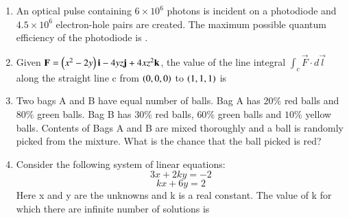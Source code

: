 \documentclass[journal,12pt,onecolumn]{IEEEtran}
\theoremstyle{remark}
\begin{document}
\begin{enumerate}
    \hfill{}

    \item An optical pulse containing $6\times10^{6}$ photons is incident on a photodiode and $4.5\times10^{6}$ electron-hole pairs are created. The maximum possible quantum efficiency  of the photodiode is \underline{\hspace{2cm}}.
    
    \hfill{}
    
    \item Given $\mathbf{F}=\left(x^{2}-2y\right)\mathbf{i}-4yz\mathbf{j}+4xz^{2}\mathbf{k}$, the value of the line integral $\int_{c}\vec{F}\cdot d\vec{l}$ along the straight line c from $\left(0,0,0\right)$ to $\left(1,1,1\right)$ is
    
    \hfill{}
    \begin{enumerate}
    \end{enumerate}

    \item Two bags A and B have equal number of balls. Bag A has $20\%$ red balls and $80\%$ green balls. Bag B has $30\%$ red balls, $60\%$ green balls and $10\%$ yellow balls. Contents of Bags A and B are mixed thoroughly and a ball is randomly picked from the mixture. What is the chance that the ball picked is red?
    
    \hfill{}
    \begin{enumerate}
    \end{enumerate}

    \item Consider the following system of linear equations:
    $$3x+2ky=-2$$
    $$kx+6y=2$$
    Here x and y are the unknowns and k is a real constant. The value of k for which there are infinite number of solutions is
    

\end{enumerate}
\end{document}
